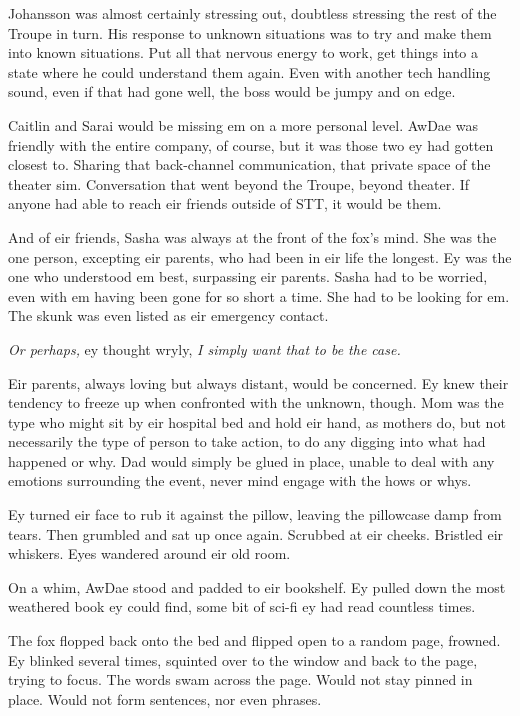 Johansson was almost certainly stressing out, doubtless stressing the rest of the Troupe in turn. His response to unknown situations was to try and make them into known situations. Put all that nervous energy to work, get things into a state where he could understand them again. Even with another tech handling sound, even if that had gone well, the boss would be jumpy and on edge.

Caitlin and Sarai would be missing em on a more personal level. AwDae was friendly with the entire company, of course, but it was those two ey had gotten closest to. Sharing that back-channel communication, that private space of the theater sim. Conversation that went beyond the Troupe, beyond theater. If anyone had able to reach eir friends outside of STT, it would be them.

And of eir friends, Sasha was always at the front of the fox's mind. She was the one person, excepting eir parents, who had been in eir life the longest. Ey was the one who understood em best, surpassing eir parents. Sasha had to be worried, even with em having been gone for so short a time. She had to be looking for em. The skunk was even listed as eir emergency contact.

\emph{Or perhaps,} ey thought wryly, \emph{I simply want that to be the case.}

Eir parents, always loving but always distant, would be concerned. Ey knew their tendency to freeze up when confronted with the unknown, though. Mom was the type who might sit by eir hospital bed and hold eir hand, as mothers do, but not necessarily the type of person to take action, to do any digging into what had happened or why. Dad would simply be glued in place, unable to deal with any emotions surrounding the event, never mind engage with the hows or whys.

Ey turned eir face to rub it against the pillow, leaving the pillowcase damp from tears. Then grumbled and sat up once again. Scrubbed at eir cheeks. Bristled eir whiskers. Eyes wandered around eir old room.

On a whim, AwDae stood and padded to eir bookshelf. Ey pulled down the most weathered book ey could find, some bit of sci-fi ey had read countless times.

The fox flopped back onto the bed and flipped open to a random page, frowned. Ey blinked several times, squinted over to the window and back to the page, trying to focus. The words swam across the page. Would not stay pinned in place. Would not form sentences, nor even phrases.

